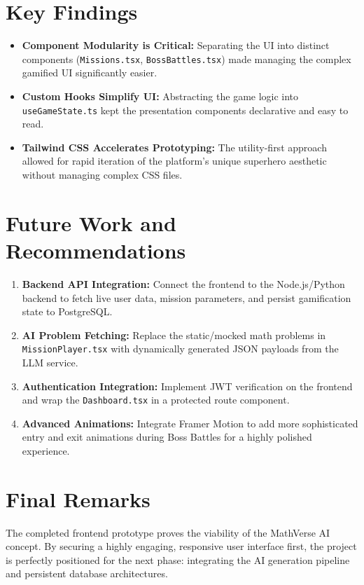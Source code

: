 \documentclass[12pt,a4paper]{report}
\begin{document}
\section{Key Findings}
\begin{itemize}
    \item \textbf{Component Modularity is Critical:} Separating the UI into distinct components (\texttt{Missions.tsx}, \texttt{BossBattles.tsx}) made managing the complex gamified UI significantly easier.
    \item \textbf{Custom Hooks Simplify UI:} Abstracting the game logic into \texttt{useGameState.ts} kept the presentation components declarative and easy to read.
    \item \textbf{Tailwind CSS Accelerates Prototyping:} The utility-first approach allowed for rapid iteration of the platform's unique superhero aesthetic without managing complex CSS files.
\end{itemize}

\section{Future Work and Recommendations}
\begin{enumerate}
    \item \textbf{Backend API Integration:} Connect the frontend to the Node.js/Python backend to fetch live user data, mission parameters, and persist gamification state to PostgreSQL.
    \item \textbf{AI Problem Fetching:} Replace the static/mocked math problems in \texttt{MissionPlayer.tsx} with dynamically generated JSON payloads from the LLM service.
    \item \textbf{Authentication Integration:} Implement JWT verification on the frontend and wrap the \texttt{Dashboard.tsx} in a protected route component.
    \item \textbf{Advanced Animations:} Integrate Framer Motion to add more sophisticated entry and exit animations during Boss Battles for a highly polished experience.
\end{enumerate}

\section{Final Remarks}
The completed frontend prototype proves the viability of the MathVerse AI concept. By securing a highly engaging, responsive user interface first, the project is perfectly positioned for the next phase: integrating the AI generation pipeline and persistent database architectures.
\end{document}
